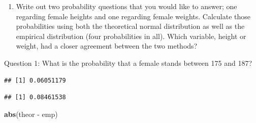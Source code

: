 \documentclass[]{article}
\newenvironment{Shaded}{\begin{snugshade}}{\end{snugshade}}
\newcommand{\KeywordTok}[1]{\textcolor[rgb]{0.13,0.29,0.53}{\textbf{{#1}}}}
\newcommand{\DataTypeTok}[1]{\textcolor[rgb]{0.13,0.29,0.53}{{#1}}}
\newcommand{\DecValTok}[1]{\textcolor[rgb]{0.00,0.00,0.81}{{#1}}}
\newcommand{\StringTok}[1]{\textcolor[rgb]{0.31,0.60,0.02}{{#1}}}
\newcommand{\CommentTok}[1]{\textcolor[rgb]{0.56,0.35,0.01}{\textit{{#1}}}}
\newcommand{\NormalTok}[1]{{#1}}
\providecommand{\tightlist}{%
  \setlength{\itemsep}{0pt}\setlength{\parskip}{0pt}}
\begin{document}
\begin{enumerate}
\def\labelenumi{\arabic{enumi}.}
\setcounter{enumi}{5}
\tightlist
\item
  Write out two probability questions that you would like to answer; one
  regarding female heights and one regarding female weights. Calculate
  those probabilities using both the theoretical normal distribution as
  well as the empirical distribution (four probabilities in all). Which
  variable, height or weight, had a closer agreement between the two
  methods?
\end{enumerate}

Question 1: What is the probability that a female stands between 175 and
187?

\begin{Shaded}
\end{Shaded}

\begin{verbatim}
## [1] 0.06051179
\end{verbatim}

\begin{Shaded}
\end{Shaded}

\begin{verbatim}
## [1] 0.08461538
\end{verbatim}

\begin{Shaded}
\begin{Highlighting}[]
\KeywordTok{abs}\NormalTok{(theor -}\StringTok{ }\NormalTok{emp)}
\end{Highlighting}
\end{Shaded}
\end{document}
